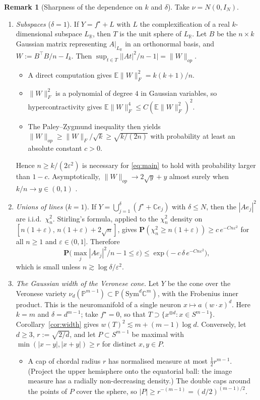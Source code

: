 \documentclass[11pt]{article}
\theoremstyle{definition}
\newtheorem{remark}[theorem]{Remark}
\numberwithin{equation}{section}
\newcommand{\R}{\mathbb{R}}
\newcommand{\C}{\mathbb{C}}
\newcommand{\PP}{\mathbb{P}}
\newcommand{\E}{\mathbb{E}}
\newcommand{\Prob}{\mathbf{P}}
\newcommand{\eps}{\varepsilon}
\newcommand{\fs}{f^{\star}}
\begin{document}
\begin{remark}[Sharpness of the dependence on $k$ and $\delta$]\label{rem:sharp}
Take $\nu=N(0,I_N)$.
\begin{enumerate}
\item[(a)] \emph{Subspaces} ($\delta=1$). If $Y=\fs+L$ with $L$ the complexification of a real $k$-dimensional subspace $L_\R$, then $T$ is the unit sphere of $L_\R$. Let $B$ be the $n\times k$ Gaussian matrix representing $A|_{L_\R}$ in an orthonormal basis, and $W:=B^\top B/n-I_k$. Then $\sup_{t\in T}\big||At|^2/n-1\big|=\|W\|_{op}$.
\begin{itemize}
\item A direct computation gives $\E\|W\|_F^2=k(k+1)/n$.
\item $\|W\|_F^2$ is a polynomial of degree $4$ in Gaussian variables, so hypercontractivity gives $\E\|W\|_F^4\le C(\E\|W\|_F^2)^2$.
\item The Paley--Zygmund inequality then yields $\|W\|_{op}\ge\|W\|_F/\sqrt k\ge\sqrt{k/(2n)}$ with probability at least an absolute constant $c>0$.
\end{itemize}
Hence $n\ge k/(2\eps^2)$ is necessary for \eqref{eq:main} to hold with probability larger than $1-c$. Asymptotically, $\|W\|_{op}\to2\sqrt y+y$ almost surely when $k/n\to y\in(0,1)$ \cite{Geman,YBK}.
\item[(b)] \emph{Unions of lines} ($k=1$). If $Y=\bigcup_{j=1}^\delta(\fs+\C e_j)$ with $\delta\le N$, then the $|Ae_j|^2$ are i.i.d.\ $\chi^2_n$. Stirling's formula, applied to the $\chi^2_n$ density on $[n(1+\eps),\,n(1+\eps)+2\sqrt n]$, gives $\Prob(\chi^2_n\ge n(1+\eps))\ge c\,e^{-Cn\eps^2}$ for all $n\ge1$ and $\eps\in(0,1]$. Therefore
\[
\Prob\big(\max_j|Ae_j|^2/n-1\le\eps\big)\le\exp\big(-c\,\delta\,e^{-Cn\eps^2}\big),
\]
which is small unless $n\gtrsim\log\delta/\eps^2$.
\item[(c)] \emph{The Gaussian width of the Veronese cone.} Let $Y$ be the cone over the Veronese variety $\nu_d(\PP^{m-1})\subset\PP(\mathrm{Sym}^d\C^m)$, with the Frobenius inner product. This is the neuromanifold of a single neuron $x\mapsto a\,(w\cdot x)^d$. Here $k=m$ and $\delta=d^{m-1}$; take $\fs=0$, so that $T\supset\{x^{\otimes d}:x\in S^{m-1}\}$. Corollary~\ref{cor:width} gives $w(T)^2\lesssim m+(m-1)\log d$. Conversely, let $d\ge3$, $r:=\sqrt{2/d}$, and let $P\subset S^{m-1}$ be maximal with $\min(|x-y|,|x+y|)\ge r$ for distinct $x,y\in P$.
\begin{itemize}
\item A cap of chordal radius $r$ has normalised measure at most $\frac12r^{m-1}$. (Project the upper hemisphere onto the equatorial ball: the image measure has a radially non-decreasing density.) The double caps around the points of $P$ cover the sphere, so $|P|\ge r^{-(m-1)}=(d/2)^{(m-1)/2}$.

\end{itemize}
\end{enumerate}
\end{remark}
\end{document}
